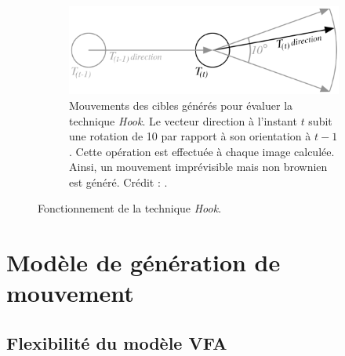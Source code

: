 \begin{appendices}
\begin{figure}[htbp]
\begin{subfigure}{.69\textwidth}
			\centering
			\includegraphics[width=\textwidth]{figures/ch2/hookDir}
			\caption[\emph{Hook} -- mouvements des cibles]{Mouvements des cibles générés pour évaluer la technique \emph{Hook}. Le vecteur direction à l'instant $t$ subit une rotation de 10\textdegree{} par rapport à son orientation à $t-1$. Cette opération est effectuée à chaque image calculée. Ainsi, un mouvement imprévisible mais non brownien est généré. Crédit : \cite{ortega2013hook}.}
			\label{fig:hookDir}
		\end{subfigure}
		\caption[\emph{Hook} -- fonctionnement]{Fonctionnement de la technique \emph{Hook}.}
		\label{fig:hook}
	\end{figure}










\cleardoublepage

\FloatBarrier
\chapter{Modèle de génération de mouvement}
\minitoc
\label{appendix:annexeZ}
\cleardoublepage


\section{Flexibilité du modèle VFA}


\end{appendices}
